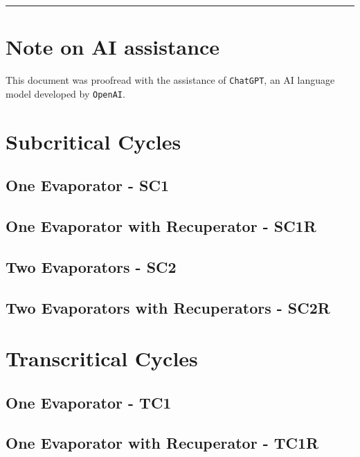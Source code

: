 \documentclass[a4paper, 12pt]{article}
\begin{document}
\renewcommand{\contentsname}{Table of Contents}
\tableofcontents

\vfill

\rule{\textwidth}{2pt}

\section*{Note on AI assistance}
This document was proofread with the assistance of \texttt{ChatGPT}, 
an AI language model developed by \texttt{OpenAI}.

\vspace{1cm}
\newpage

\section{Subcritical Cycles}

\subsection{One Evaporator - SC1}


\subsection{One Evaporator with Recuperator - SC1R}


\subsection{Two Evaporators - SC2}


\subsection{Two Evaporators with Recuperators - SC2R}


\section{Transcritical Cycles}

\subsection{One Evaporator - TC1}


\subsection{One Evaporator with Recuperator - TC1R}

\end{document}
